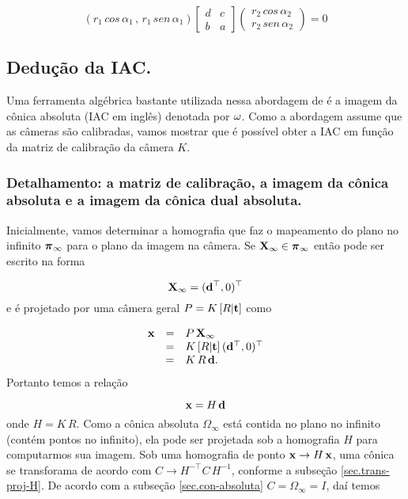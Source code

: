 \begin{equation*}
(r_1\,cos\,\alpha_1\,,\,r_1\,sen\,\alpha_1)
\begin{bmatrix}
d&c\\
b&a
\end{bmatrix}
\begin{pmatrix}
r_2\,cos\,\alpha_2\\
r_2\,sen\,\alpha_2
\end{pmatrix}
=0
\end{equation*}


\subsection{Dedução da IAC.}

Uma ferramenta algébrica bastante utilizada nessa abordagem de \citep{2503343} é a imagem da cônica absoluta (IAC em inglês) denotada por ${\bf \omega}$. Como a abordagem assume que as câmeras são calibradas, vamos mostrar que é possível obter a IAC em função da matriz de calibração da câmera $K$.

\subsubsection{Detalhamento: a matriz de calibração, a imagem da cônica absoluta e a imagem da cônica dual absoluta.}

 Inicialmente, vamos determinar a homografia que faz o mapeamento do plano no infinito $\boldsymbol{\pi}_\infty$ para o plano da imagem na câmera. Se $\mathbf{X}_\infty\in\boldsymbol{\pi}_\infty$ então pode ser escrito na forma

\begin{equation*}
\mathbf{X}_\infty=({\bf d}^\top,0)^\top
\end{equation*} 
e é projetado por uma câmera geral $P=K\,[R|{\bf t}]$ como

\begin{equation*}
\begin{array}{rcl}
\mathbf{x}&=&P\,\mathbf{X}_\infty\\
&=&K\,[R|{\bf t}]\,({\bf d}^\top,0)^\top\\
&=&K\,R\,{\bf d}.
\end{array}
\end{equation*}
Portanto temos a relação

\begin{equation*}
\mathbf{x}=H\,{\bf d}
\end{equation*}
onde $H=K\,R$. Como a cônica absoluta $\Omega_\infty$ está contida no plano no infinito (contém pontos no infinito), ela pode ser projetada sob a homografia $H$ para computarmos sua imagem.
Sob uma homografia de ponto $\mathbf{x}\rightarrow H\,\mathbf{x}$, uma cônica se transforama de acordo com $C\rightarrow H^{-\top} C\,H^{-1}$, conforme a subseção \ref{sec.trans-proj-H}. De acordo com a subseção \ref{sec.con-absoluta} $C=\Omega_\infty =I$, daí temos

